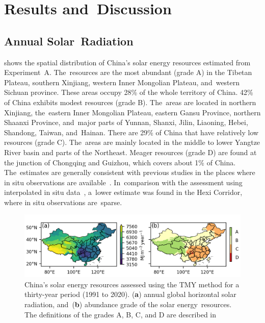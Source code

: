\documentclass[atmosphere,article,accept,pdftex,moreauthors]{Definitions/mdpi}
\begin{document}
\section{Results and~Discussion}\label{sec:results}
\unskip

\subsection{Annual Solar~Radiation}

 shows the spatial distribution of China's solar energy resources estimated from Experiment~A. The~resources are the most abundant (grade A) in the Tibetan Plateau, southern Xinjiang, western Inner Mongolian Plateau, and~western Sichuan province. These areas occupy 28\% of the whole territory of China. 42\% of China exhibits modest resources (grade B). The~areas are located in northern Xinjiang, the~eastern Inner Mongolian Plateau, eastern Gansu Province, northern Shaanxi Province, and~major parts of Yunnan, Shanxi, Jilin, Liaoning, Hebei, Shandong, Taiwan, and~Hainan. There are 29\% of China that have relatively low resources (grade C). The~areas are mainly located in the middle to lower Yangtze River basin and parts of the Northeast. Meager resources (grade D) are found at the junction of Chongqing and Guizhou, which covers about 1\% of China. The~estimates are generally consistent with previous studies in the places where in situ observations are available~\cite{tang2023ESSD}. In~comparison with the assessment using interpolated in situ data~\cite{li2010PG}, a~lower estimate was found in the Hexi Corridor, where in situ observations are~sparse.

\begin{figure}[H]
  \includegraphics[width=13.8cm]{fig/tmy-resource-grade.png}
  \caption{China's solar energy resources assessed using the TMY method for a thirty-year period (1991 to 2020). (\textbf{a}) annual global horizontal solar radiation, and~(\textbf{b}) abundance grade of the solar energy~resources. The definitions of the grades A, B, C, and D are described in  \label{fig:richness_grade}}
\end{figure}
\end{document}
